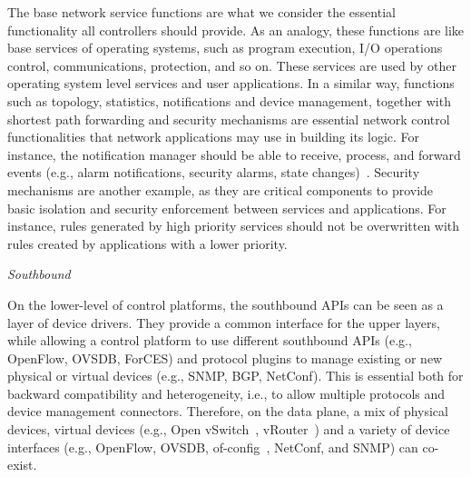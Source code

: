 The base network service functions are what we consider the essential functionality all controllers should provide.
As an analogy, these functions are like base services of operating systems, 
such as program execution, I/O operations control, communications, protection, and so on. 
These services are used by other operating 
system level services and user applications. 
In a similar way, functions such as topology, statistics, notifications and device management, together with shortest path forwarding and security mechanisms are essential network control functionalities that network applications may use in building its logic.
For instance, the notification manager should be able to receive, process, and forward events (e.g., alarm notifications, security alarms, state changes)~\cite{onf2013-2}.
Security mechanisms are another example, as they are critical components to provide basic isolation and security enforcement between services and applications.
For instance, rules generated by high priority services should not be overwritten with rules created by applications with a lower priority.



\vspace{2mm}
\noindent \textit{Southbound}

On the lower-level of control platforms, the southbound APIs can be seen as a layer of device drivers.
They provide a common interface for the upper layers, while allowing a control platform to use different 
southbound APIs (e.g., OpenFlow, OVSDB, ForCES) and protocol plugins to manage existing or new physical or 
virtual devices (e.g., SNMP, BGP, NetConf). This is essential both for backward compatibility and heterogeneity, 
i.e., to allow multiple protocols and device management connectors. Therefore, on the data plane, a mix of physical devices, virtual devices (e.g., Open vSwitch~\cite{listofcontributors2013,pfaff2009}, vRouter~\cite{singla2013}) and a variety of device interfaces (e.g., OpenFlow, OVSDB, of-config~\cite{onf2013-1}, NetConf, and SNMP) can co-exist.

